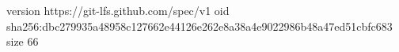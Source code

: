 version https://git-lfs.github.com/spec/v1
oid sha256:dbc279935a48958c127662e44126e262e8a38a4e9022986b48a47ed51cbfc683
size 66
